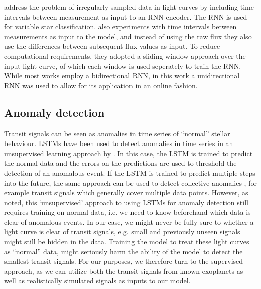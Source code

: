 \cite{naul2018recurrent} address the problem of irregularly sampled data in light curves by including time intervals between measurement as input to an RNN encoder. The RNN is used for variable star classification. \cite{becker2020scalable} also experiments with time intervals between measurements as input to the model, and instead of using the raw flux they also use the differences between subsequent flux values as input. To reduce computational requirements, they adopted a sliding window approach over the input light curve, of which each window is used seperately to train the RNN. While most works employ a bidirectional RNN, in this work a unidirectional RNN was used to allow for its application in an online fashion.


\subsection{Anomaly detection}
Transit signals can be seen as anomalies in time series of ``normal'' stellar behaviour. LSTMs have been used to detect anomalies in time series in an unsupervised learning approach by \cite{malhotra2015long}. In this case, the LSTM is trained to predict the normal data and the errors on the predictions are used to threshold the detection of an anomalous event. If the LSTM is trained to predict multiple steps into the future, the same approach can be used to detect collective anomalies \citep{bontemps2016collective}, for example transit signals which generally cover multiple data points. However, as \cite{cherdo2020training} noted, this `unsupervised' approach to using LSTMs for anomaly detection still requires training on normal data, i.e. we need to know beforehand which data is clear of anomalous events. In our case, we might never be fully sure to whether a light curve is clear of transit signals, e.g. small and previously unseen signals might still be hidden in the data. Training the model to treat these light curves as ``normal'' data, might seriously harm the ability of the model to detect the smallest transit signals. For our purposes, we therefore turn to the supervised approach, as we can utilize both the transit signals from known exoplanets as well as realistically simulated signals as inputs to our model. 


